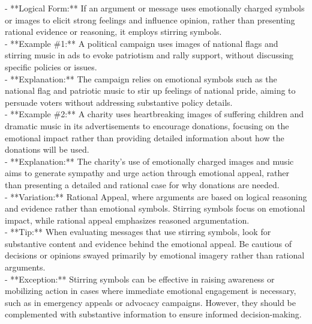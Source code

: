 \documentclass[a4paper,12pt,single,pdftex]{scrbook}
\begin{document}
    
      - **Logical Form:** If an argument or message uses emotionally charged symbols or images to elicit strong feelings and influence opinion, rather than presenting rational evidence or reasoning, it employs stirring symbols.
    \\

    
      - **Example \#1:** A political campaign uses images of national flags and stirring music in ads to evoke patriotism and rally support, without discussing specific policies or issues.
    \\

    
      - **Explanation:** The campaign relies on emotional symbols such as the national flag and patriotic music to stir up feelings of national pride, aiming to persuade voters without addressing substantive policy details.
    \\

    
      - **Example \#2:** A charity uses heartbreaking images of suffering children and dramatic music in its advertisements to encourage donations, focusing on the emotional impact rather than providing detailed information about how the donations will be used.
    \\

    
      - **Explanation:** The charity's use of emotionally charged images and music aims to generate sympathy and urge action through emotional appeal, rather than presenting a detailed and rational case for why donations are needed.
    \\

    
      - **Variation:** Rational Appeal, where arguments are based on logical reasoning and evidence rather than emotional symbols. Stirring symbols focus on emotional impact, while rational appeal emphasizes reasoned argumentation.
    \\

    
      - **Tip:** When evaluating messages that use stirring symbols, look for substantive content and evidence behind the emotional appeal. Be cautious of decisions or opinions swayed primarily by emotional imagery rather than rational arguments.
    \\

    
      - **Exception:** Stirring symbols can be effective in raising awareness or mobilizing action in cases where immediate emotional engagement is necessary, such as in emergency appeals or advocacy campaigns. However, they should be complemented with substantive information to ensure informed decision-making.
    \\
\end{document}

